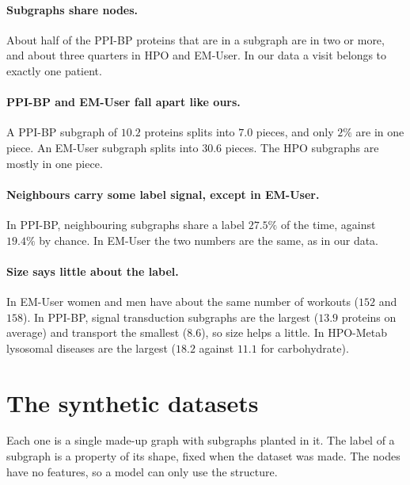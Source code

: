 \documentclass[11pt]{article}
\begin{document}
\paragraph{Subgraphs share nodes.} About half of the PPI-BP proteins that are in a subgraph
are in two or more, and about three quarters in HPO and EM-User. In our data a visit belongs
to exactly one patient.

\paragraph{PPI-BP and EM-User fall apart like ours.} A PPI-BP subgraph of $10.2$ proteins
splits into $7.0$ pieces, and only $2\%$ are in one piece. An EM-User subgraph splits into
$30.6$ pieces. The HPO subgraphs are mostly in one piece.

\paragraph{Neighbours carry some label signal, except in EM-User.} In PPI-BP, neighbouring
subgraphs share a label $27.5\%$ of the time, against $19.4\%$ by chance. In EM-User the two
numbers are the same, as in our data.

\paragraph{Size says little about the label.} In EM-User women and men have about the same
number of workouts ($152$ and $158$). In PPI-BP, signal transduction subgraphs are the
largest ($13.9$ proteins on average) and transport the smallest ($8.6$), so size helps a
little. In HPO-Metab lysosomal diseases are the largest ($18.2$ against $11.1$ for
carbohydrate).

\section*{The synthetic datasets}

Each one is a single made-up graph with subgraphs planted in it. The label of a subgraph
is a property of its shape, fixed when the dataset was made. The nodes have no features, so
a model can only use the structure.
\end{document}
